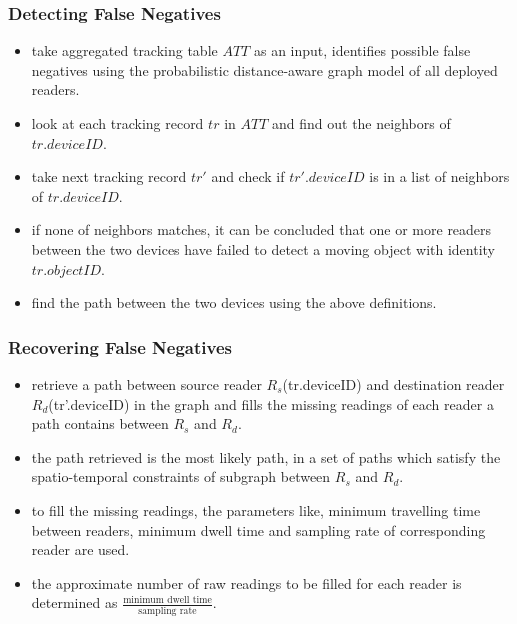 \begin{frame}
\frametitle{Detecting False Negatives}

\begin{itemize}

  \item take aggregated tracking table $ATT$ as an input, identifies possible false negatives using the probabilistic distance-aware graph model of all deployed readers.

  \item look at each tracking record $tr$ in $ATT$ and find out the neighbors of $tr.deviceID$.

  \item take next tracking record $tr'$ and check if $tr'.deviceID$ is in a list of neighbors of $tr.deviceID$.

  \item if none of neighbors matches, it can be concluded that one or more readers between the two devices have failed to detect a moving object with identity $tr.objectID$.

  \item find the path between the two devices using the above definitions.

\end{itemize}

\end{frame}


\begin{frame}
\frametitle{Recovering False Negatives}

\begin{itemize}

  \item retrieve a path between source reader $R_s$(tr.deviceID) and destination reader $R_d$(tr'.deviceID) in the graph and fills the missing readings of each reader a path contains between $R_s$ and $R_d$.

  \item the path retrieved is the most likely path, in a set of paths which satisfy the spatio-temporal constraints of subgraph between $R_s$ and $R_d$.

  \item to fill the missing readings, the parameters like, minimum travelling time between readers, minimum dwell time and sampling rate of corresponding reader are used.

  \item the approximate number of raw readings to be filled for each reader is determined as $\frac{\text{minimum dwell time}}{\text{sampling rate}}$.

\end{itemize}

\end{frame}


